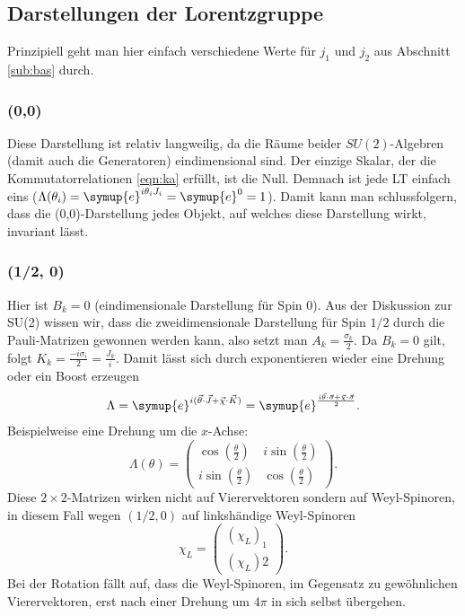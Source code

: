 \documentclass[
  captions=tableheading,  %
  titlepage=firstiscover, %
]{scrartcl}
\begin{document}
\subsection{Darstellungen der Lorentzgruppe}
Prinzipiell geht man hier einfach verschiedene Werte für $j_1$ und $j_2$ aus Abschnitt \ref{sub:bas} durch.
\subsubsection{(0,0)}
Diese Darstellung ist relativ langweilig, da die Räume beider $SU(2)$-Algebren (damit auch die Generatoren) eindimensional sind.
Der einzige Skalar, der die Kommutatorrelationen \eqref{eqn:ka} erfüllt, ist die Null.
Demnach ist jede LT einfach eins ($\Lambda(\theta_i) = \symup{e}^{i\theta_i J_i} = \symup{e}^{0} = 1$).
Damit kann man schlussfolgern, dass die (0,0)-Darstellung jedes Objekt, auf welches diese Darstellung wirkt, invariant lässt.
\subsubsection{(1/2, 0)}
\label{sub:left}
Hier ist $B_k = 0$ (eindimensionale Darstellung für Spin 0).
Aus der Diskussion zur SU(2) wissen wir, dass die zweidimensionale Darstellung für Spin $1/2$ durch die Pauli-Matrizen gewonnen werden kann, 
also setzt man $A_k = \frac{\sigma_k}{2}$.
Da $B_k = 0$ gilt, folgt $K_k = \frac{-i\sigma_i}{2} = \frac{J_k}{i}$.
Damit lässt sich durch exponentieren wieder eine Drehung oder ein Boost erzeugen
\begin{equation*}
  \Lambda  = \symup{e}^{i ( \vec{\theta} \cdot \vec{J} + \vec{\chi} \cdot \vec{K})} 
  = \symup{e}^{\frac{i\vec{\theta} \cdot \vec{\sigma} +\vec{\chi} \cdot \vec{\sigma}}{2}}.
\end{equation*}
Beispielweise eine Drehung um die $x$-Achse:
\begin{equation*}
  \Lambda(\theta) = 
  \begin{pmatrix}
    \cos(\frac{\theta}{2}) & i \sin(\frac{\theta}{2}) \\
    i\sin(\frac{\theta}{2}) & \cos(\frac{\theta}{2}) 
  \end{pmatrix} .
\end{equation*} 
Diese $2 \times 2$-Matrizen wirken nicht auf Vierervektoren sondern auf Weyl-Spinoren, in diesem Fall wegen $(1/2,0)$ auf 
linkshändige Weyl-Spinoren 
\begin{equation*}
  \chi_L = 
  \begin{pmatrix}
  (\chi_L)_1 \\ (\chi_L)2  
  \end{pmatrix}.
\end{equation*}
Bei der Rotation fällt auf, dass die Weyl-Spinoren, im Gegensatz zu gewöhnlichen
Vierervektoren, erst nach einer Drehung um $4\pi$ in sich selbst übergehen.
\end{document}

